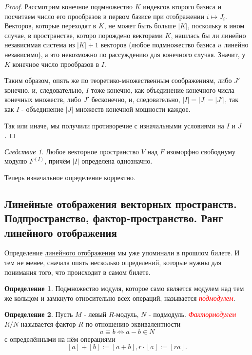 \documentclass[a4paper,100pt]{article}
\theoremstyle{indented}
\theoremstyle{definition}
\newtheorem{defn}{Определение}
\theoremstyle{remark}
\newtheorem{cons}{Следствие}
\begin{document}
\begin{proof}
    Рассмотрим конечное подмножество $K$ индексов второго базиса и посчитаем число его прообразов в первом базисе при отображении $i\mapsto J_i$. Векторов, которые переходят в $K$, не может быть больше $\vert K\vert $, поскольку в ином случае, в пространстве, которо порождено векторами $K$, нашлась бы ли линейно независимая система из $\vert K\vert +1$ векторов (любое подмножество базиса $u$ линейно независимо), а это невозможно по рассуждению для конечного случая. Значит, у $K$ конечное число прообразов в $I$. \ 

    Таким образом, опять же по теоретико-множественным соображениям, либо $J'$ конечно, и, следовательно, $I$ тоже конечно, как объединение конечного числа конечных множеств, либо $J'$ бесконечно, и, следовательно, $\vert I\vert = \vert J\vert = \vert J'\vert$, так как $I$ - объединение $\vert J\vert$  множеств конечной мощности каждое.\ 

    Так или иначе, мы получили противоречие с изначальными условиями на $I$ и $J$.
\end{proof}

\begin{cons}
    Любое векторное пространство $V$ над $F$ изоморфно свободнуму модулю $ F^{(I)}$, причём $\vert I\vert$ определена однозначно.
\end{cons}

Теперь изначальное определение корректно.

\resetall

\subsection{Линейные отображения векторных пространств. Подпространство, фактор-пространство. Ранг линейного отображения}

Определение \hyperlink{n48}{линейного отображения} мы уже упоминали в прошлом билете. И тем не менее, сначала опять несколько определений, которые нужны для понимания того, что происходит в самом билете.

\begin{defn}
    Подмножество модуля, которое само является модулем над тем же кольцом и замкнуто относительно всех операций, называется \hypertarget{n49}{\textcolor{red}{\textit{подмодулем}}}.
\end{defn}

\begin{defn}
    Пусть $M$ - левый $R$-модуль, $N$ - подмодуль. \hypertarget{n50}{\textcolor{red}{\textit{Фактормодулем}}} $R/N$ называется фактор $R$ по отношению эквивалентности 
    \[
        a\equiv b \Longleftrightarrow a-b\in N
    \]
    с определёнными на нём операциями
    \[
        [a]+[b]:=[a+b], r\cdot[a]:=[ra].
    \]
\end{defn}
\end{document}
